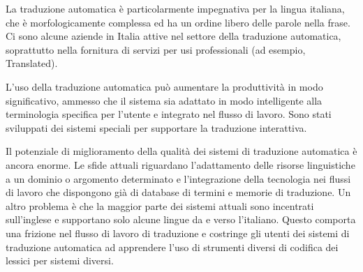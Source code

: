 \begin{multicols}{2}

La traduzione automatica \`{e} particolarmente impegnativa per la lingua italiana, che \`{e} morfologicamente complessa ed ha un ordine libero delle parole nella frase. Ci sono alcune aziende in Italia attive nel settore della traduzione automatica, soprattutto nella fornitura di servizi per usi professionali (ad esempio, Translated).

L'uso della traduzione automatica pu\`{o} aumentare la produttivit\`{a} in modo significativo, ammesso che il sistema sia adattato in modo intelligente alla terminologia specifica per l'utente e integrato nel flusso di lavoro. Sono stati sviluppati dei sistemi speciali per supportare la traduzione interattiva.

Il potenziale di miglioramento della qualit\`{a} dei sistemi di traduzione automatica \`{e} ancora enorme. Le sfide attuali riguardano l'adattamento delle risorse linguistiche a un dominio o argomento determinato e l'integrazione della tecnologia nei flussi di lavoro che dispongono gi\`{a} di database di termini e memorie di traduzione. Un altro problema \`{e} che la maggior parte dei sistemi attuali sono incentrati sull'inglese e supportano solo alcune lingue da e verso l'italiano. Questo comporta una frizione nel flusso di lavoro di traduzione e costringe gli utenti dei sistemi di traduzione automatica ad apprendere l'uso di strumenti diversi di codifica dei lessici per sistemi diversi.


\end{multicols}
